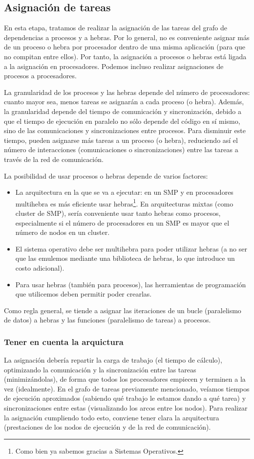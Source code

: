 \subsection{Asignación de tareas} 
En esta etapa, tratamos de realizar la asignación de las tareas del grafo de dependencias a procesos y a hebras. Por lo general, no es conveniente asignar más de un proceso o hebra por procesador dentro de una misma aplicación (para que no compitan entre ellos). Por tanto, la asignación a procesos o hebras está ligada a la asignación en procesadores. Podemos incluso realizar asignaciones de procesos a procesadores. 

La granularidad de los procesos y las hebras depende del número de procesadores: cuanto mayor sea, menos tareas se asignarán a cada proceso (o hebra). Además, la granularidad depende del tiempo de comunicación y sincronización, debido a que el tiempo de ejecución en paralelo no sólo depende del código en sí mismo, sino de las comunicaciones y sincronizaciones entre procesos. Para disminuir este tiempo, pueden asignarse más tareas a un proceso (o hebra), reduciendo así el número de interacciones (comunicaciones o sincronizaciones) entre las tareas a través de la red de comunicación. 

La posibilidad de usar procesos o hebras depende de varios factores:
\begin{itemize}
    \item La arquitectura en la que se va a ejecutar: en un SMP y en procesadores multihebra es más eficiente usar hebras\footnote{Como bien ya sabemos gracias a Sistemas Operativos.}. En arquitecturas mixtas (como cluster de SMP), sería conveniente usar tanto hebras como procesos, especialmente si el número de procesadores en un SMP es mayor que el número de nodos en un cluster.
    \item El sistema operativo debe ser multihebra para poder utilizar hebras (a no ser que las emulemos mediante una biblioteca de hebras, lo que introduce un costo adicional).
    \item Para usar hebras (también para procesos), las herramientas de programación que utilicemos deben permitir poder crearlas.
\end{itemize}
Como regla general, se tiende a asignar las iteraciones de un bucle (paralelismo de datos) a hebras y las funciones (paralelismo de tareas) a procesos.

\subsubsection{Tener en cuenta la arquictura}
La asignación debería repartir la carga de trabajo (el tiempo de cálculo), optimizando la comunicación y la sincronización entre las tareas (minimizándolas), de forma que todos los procesadores empiecen y terminen a la vez (idealmente). En el grafo de tareas previamente mencionado, veíamos tiempos de ejecución aproximados (sabiendo qué trabajo le estamos dando a qué tarea) y sincronizaciones entre estas (visualizando los arcos entre los nodos). Para realizar la asignación cumpliendo todo esto, conviene tener clara la arquitectura (prestaciones de los nodos de ejecución y de la red de comunicación).

